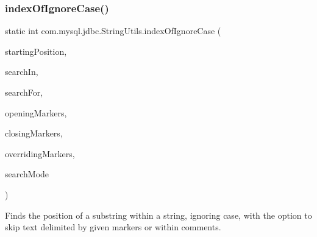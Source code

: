 \subsubsection{\texorpdfstring{index\+Of\+Ignore\+Case()}{indexOfIgnoreCase()}\hspace{0.1cm}{\footnotesize\ttfamily [5/5]}}
{\footnotesize\ttfamily static int com.\+mysql.\+jdbc.\+String\+Utils.\+index\+Of\+Ignore\+Case (\begin{DoxyParamCaption}\item[{int}]{starting\+Position,  }\item[{String}]{search\+In,  }\item[{String}]{search\+For,  }\item[{String}]{opening\+Markers,  }\item[{String}]{closing\+Markers,  }\item[{String}]{overriding\+Markers,  }\item[{Set$<$ \mbox{\hyperlink{enumcom_1_1mysql_1_1jdbc_1_1_string_utils_1_1_search_mode}{Search\+Mode}} $>$}]{search\+Mode }\end{DoxyParamCaption})\hspace{0.3cm}{\ttfamily [static]}}

Finds the position of a substring within a string, ignoring case, with the option to skip text delimited by given markers or within comments.


